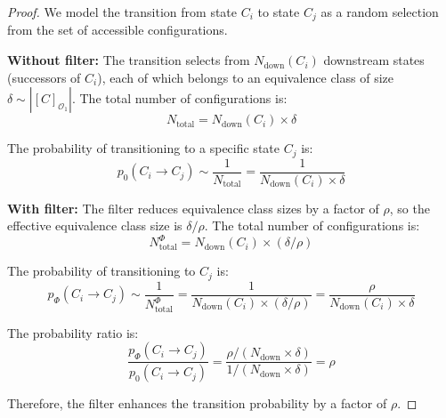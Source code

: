\begin{proof}
We model the transition from state $C_i$ to state $C_j$ as a random selection from the set of accessible configurations.

\textbf{Without filter:} The transition selects from $N_{\text{down}}(C_i)$ downstream states (successors of $C_i$), each of which belongs to an equivalence class of size $\delta \sim |[C]_{\mathcal{O}_1}|$. The total number of configurations is:
\begin{equation}
N_{\text{total}} = N_{\text{down}}(C_i) \times \delta
\end{equation}

The probability of transitioning to a specific state $C_j$ is:
\begin{equation}
p_0(C_i \to C_j) \sim \frac{1}{N_{\text{total}}} = \frac{1}{N_{\text{down}}(C_i) \times \delta}
\end{equation}

\textbf{With filter:} The filter reduces equivalence class sizes by a factor of $\rho$, so the effective equivalence class size is $\delta/\rho$. The total number of configurations is:
\begin{equation}
N_{\text{total}}^{\Phi} = N_{\text{down}}(C_i) \times (\delta/\rho)
\end{equation}

The probability of transitioning to $C_j$ is:
\begin{equation}
p_{\Phi}(C_i \to C_j) \sim \frac{1}{N_{\text{total}}^{\Phi}} = \frac{1}{N_{\text{down}}(C_i) \times (\delta/\rho)} = \frac{\rho}{N_{\text{down}}(C_i) \times \delta}
\end{equation}

The probability ratio is:
\begin{equation}
\frac{p_{\Phi}(C_i \to C_j)}{p_0(C_i \to C_j)} = \frac{\rho / (N_{\text{down}} \times \delta)}{1 / (N_{\text{down}} \times \delta)} = \rho
\end{equation}

Therefore, the filter enhances the transition probability by a factor of $\rho$.
\end{proof}

